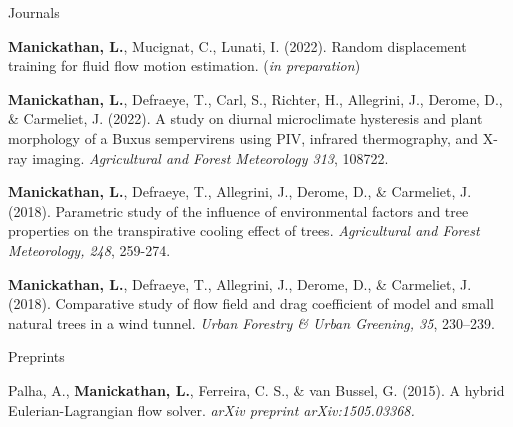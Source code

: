 \documentclass[11pt, a4paper]{preamble/awesome-cv-novo}
\begin{document}
\begin{cventries}

  \pubentry
  {Journals} %
  {
    \begin{cvitems}
      \item {\textbf{Manickathan, L.}, Mucignat, C., Lunati, I. (2022). Random displacement training for fluid flow motion estimation. {\bodyfontlight(\textit{in preparation})}}
      \item {\textbf{Manickathan, L.}, Defraeye, T., Carl, S., Richter, H., Allegrini, J., Derome, D., \& Carmeliet, J. (2022). A study on diurnal microclimate hysteresis and plant morphology of a Buxus sempervirens using PIV, infrared thermography, and X-ray imaging. {\bodyfontlight\textit{Agricultural and Forest Meteorology 313}, 108722.}}
      \item {\textbf{Manickathan, L.}, Defraeye, T., Allegrini, J., Derome, D., \& Carmeliet, J. (2018). Parametric study of the influence of environmental factors and tree properties on the transpirative cooling effect of trees. {\bodyfontlight\textit{Agricultural and Forest Meteorology, 248}, 259-274.}}
      \item {\textbf{Manickathan, L.}, Defraeye, T., Allegrini, J., Derome, D., \& Carmeliet, J. (2018). Comparative study of flow field and drag coefficient of model and small natural trees in a wind tunnel. {\bodyfontlight\textit{Urban Forestry \& Urban Greening, 35}, 230–239.}}
    \end{cvitems}
  }

  \pubentry
  {Preprints}
  {
    \begin{cvitems}
      \item {Palha, A., \textbf{Manickathan, L.}, Ferreira, C. S., \& van Bussel, G. (2015). A hybrid Eulerian-Lagrangian flow solver. {\bodyfontlight\textit{arXiv preprint arXiv:1505.03368.}}}
    \end{cvitems}
  }


\end{cventries}
\end{document}
